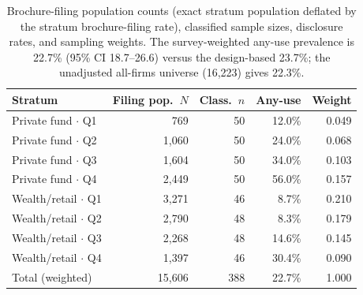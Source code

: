 \documentclass[utf8]{FrontiersinHarvard}
\begin{document}
\begin{table}[h!]
\caption{Brochure-filing population counts (exact stratum population deflated by the stratum brochure-filing rate), classified sample sizes, disclosure rates, and sampling weights. The survey-weighted any-use prevalence is 22.7\% (95\% CI 18.7--26.6) versus the design-based 23.7\%; the unadjusted all-firms universe (16{,}223) gives 22.3\%.}
\label{tab:weighting}
\centering
\begin{tabular}{lrrrr}
\toprule
Stratum & Filing pop.\ $N$ & Class.\ $n$ & Any-use & Weight \\
\midrule
Private fund $\cdot$ Q1 & 769 & 50 & 12.0\% & 0.049 \\
Private fund $\cdot$ Q2 & 1{,}060 & 50 & 24.0\% & 0.068 \\
Private fund $\cdot$ Q3 & 1{,}604 & 50 & 34.0\% & 0.103 \\
Private fund $\cdot$ Q4 & 2{,}449 & 50 & 56.0\% & 0.157 \\
Wealth/retail $\cdot$ Q1 & 3{,}271 & 46 & 8.7\% & 0.210 \\
Wealth/retail $\cdot$ Q2 & 2{,}790 & 48 & 8.3\% & 0.179 \\
Wealth/retail $\cdot$ Q3 & 2{,}268 & 48 & 14.6\% & 0.145 \\
Wealth/retail $\cdot$ Q4 & 1{,}397 & 46 & 30.4\% & 0.090 \\
Total (weighted) & 15{,}606 & 388 & 22.7\% & 1.000 \\
\bottomrule
\end{tabular}
\end{table}
\end{document}
